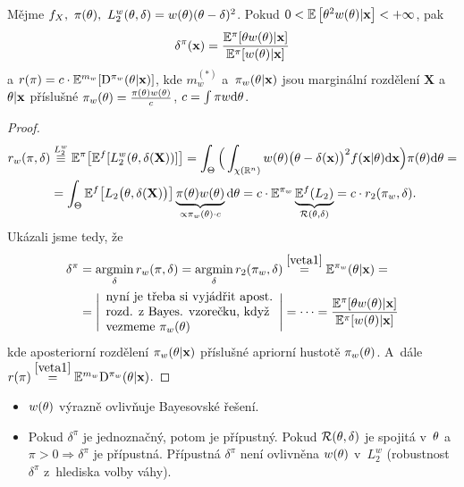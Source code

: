 \begin{theorem}
	Mějme $f_X,~\pi(\theta),~L_2^w(\theta,\delta)=w(\theta)(\theta-\delta)^2$. Pokud $0<\mathbb{E}\left[ \theta^2w(\theta)|\textbf{x} \right]<+\infty$, pak $$\delta^\pi(\textbf{x})=\frac{\mathbb{E}^\pi[{\theta w(\theta)|\textbf{x}}]}{\mathbb{E}^{\pi}[{w(\theta)|\textbf{x}}]}$$
	a $r(\pi)=c\cdot\mathbb{E}^{m_w}[\mathrm{D}^{\pi_w}(\theta|\textbf{x})]$, kde $m_w^{(*)}$ a~$\pi_w(\theta|\textbf{x})$ jsou marginální rozdělení $\textbf{X}$ a~$\theta|\textbf{x}$ příslušné $\pi_w(\theta)=\frac{\pi(\theta)w(\theta)}{c}$, $c=\int\pi w\mathrm{d}\theta$.
	\begin{proof}
		\[
		\begin{split}
		r_w(\pi,\delta)&\stackrel{L_2^w}{\equiv}\mathbb{E}^\pi\big[\mathbb{E}^f[L_2^w(\theta,\delta(\textbf{X}))]\big]=\int_\Theta\Big(\int_{\chi(\mathbb{R}^n)} w(\theta)\big(\theta-\delta(\textbf{x})\big)^2 f(\textbf{x}|\theta)\mathrm{d}\textbf{x}\Big)\pi(\theta)\mathrm{d}\theta=\\
		&= \int_\Theta \mathbb{E}^f\big[L_2\big(\theta,\delta(\textbf{X})\big)\big]\underbrace{ \pi(\theta)w(\theta)}_{\propto \pi_w(\theta)\cdot c}\mathrm{d}\theta = c\cdot\mathbb{E}^{\pi_w}\underbrace{\mathbb{E}^f (L_2)}_{\mathcal{R}(\theta,\delta)}=c\cdot r_2(\pi_w,\delta).
		\end{split}
		\]
		Ukázali jsme tedy, že  
		\begin{align*}
		\delta^\pi&=\mathop{\mathrm{argmin}}_\delta r_w(\pi,\delta)=\mathop{\mathrm{argmin}}_\delta r_2(\pi_w,\delta)\stackrel{\ref{veta1}}{=}\mathbb{E}^{\pi_w}(\theta|\textbf{x})=\\
		&=\Bigg| 
		\begin{array}{l}
		\text{nyní je třeba si vyjádřit apost.} \\
		\text{rozd. z~Bayes. vzorečku, když} \\
		\text{vezmeme } \pi_{w}(\theta)
		\end{array}
		 \Bigg|=\dots=\frac{\mathbb{E}^\pi[{\theta w(\theta)|\textbf{x}}]}{\mathbb{E}^{\pi}[{w(\theta)|\textbf{x}}]}
		 \end{align*} 
		kde aposteriorní rozdělení $\pi_w(\theta|\textbf{x})$ příslušné apriorní hustotě $\pi_w(\theta)$. A~dále $r(\pi)\stackrel{\ref{veta1}}{=}\mathbb{E}^{m_w}\mathrm{D}^{\pi_w}(\theta|\textbf{x})$.
	\end{proof}
\end{theorem}
\begin{remark}\begin{itemize}
		\item $w(\theta)$ výrazně ovlivňuje Bayesovské řešení.
		\item Pokud $\delta^\pi$ je jednoznačný, potom je přípustný. Pokud $\mathcal{R}(\theta,\delta)$ je spojitá v~$\theta$ a~$\pi>0\Rightarrow\delta^\pi$ je přípustná. Přípustná $\delta^\pi$ není ovlivněna $w(\theta)$ v~$L_2^w$ (robustnost $\delta^\pi$ z~hlediska volby váhy).
	\end{itemize}
\end{remark}

